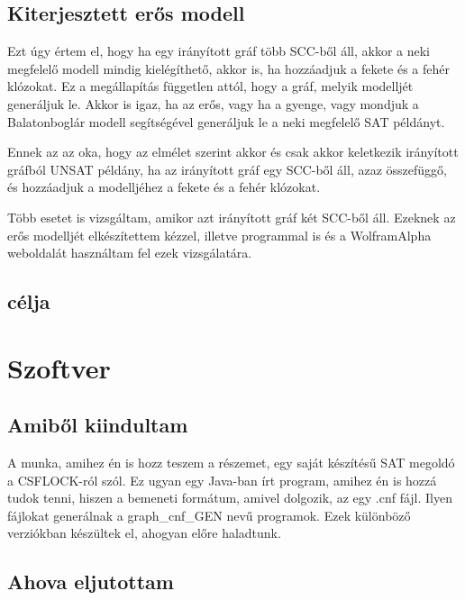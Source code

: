 \documentclass[
]{thesis-ekf}
\newtheorem{tetel}{Tétel}[chapter]
\theoremstyle{definition}
\theoremstyle{remark}
\begin{document}
	\section{Kiterjesztett erős modell}\label{esm}
	Ezt úgy értem el, hogy ha egy irányított gráf több SCC-ből áll, akkor a neki megfelelő modell mindig kielégíthető, akkor is, ha hozzáadjuk a fekete és a fehér klózokat. Ez a megállapítás független attól, hogy a gráf, melyik modelljét generáljuk le. Akkor is igaz, ha az erős, vagy ha a gyenge, vagy mondjuk a Balatonboglár modell segítségével generáljuk le a neki megfelelő SAT példányt.
	
	Ennek az az oka, hogy az elmélet szerint akkor és csak akkor keletkezik irányított gráfból UNSAT példány, ha az irányított gráf egy SCC-ből áll, azaz összefüggő, és hozzáadjuk a modelljéhez a fekete és a fehér klózokat.
	
	Több esetet is vizsgáltam, amikor azt irányított gráf két SCC-ből áll. Ezeknek az erős modelljét elkészítettem kézzel, illetve programmal is és a WolframAlpha weboldalát használtam fel ezek vizsgálatára.
	
	
	
	\section{célja}
	
	\chapter{Szoftver}
	\section{Amiből kiindultam}
	A munka, amihez én is hozz teszem a részemet, egy saját készítésű SAT megoldó a CSFLOCK-ról szól. Ez ugyan egy Java-ban írt program, amihez én is hozzá tudok tenni, hiszen a bemeneti formátum, amivel dolgozik, az egy .cnf fájl. Ilyen fájlokat generálnak a graph\_cnf\_GEN nevű programok. Ezek különböző verziókban készültek el, ahogyan előre haladtunk.
	
	\section{Ahova eljutottam}
	
%	
\end{document}
